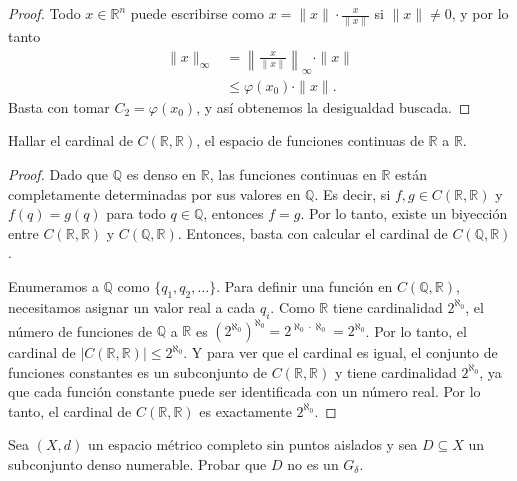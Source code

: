 \begin{proof}
    Todo $x \in \mathbb{R}^n$ puede escribirse como $x = \| x \| \cdot \frac{x}{\| x \|}$ si $\| x \| \neq 0$, y por lo tanto
    \begin{align*}
        \| x \|_{\infty} &= \left\| \frac{x}{\| x \|} \right\|_{\infty} \cdot \| x \| \\
        &\leq \varphi(x_0) \cdot \| x \|.
    \end{align*}
    Basta con tomar $C_2 = \varphi(x_0)$, y así obtenemos la desigualdad buscada.
\end{proof}

\begin{exercise}
    Hallar el cardinal de $C(\mathbb{R}, \mathbb{R})$, el espacio de funciones continuas de $\mathbb{R}$ a $\mathbb{R}$.
\end{exercise}

\begin{proof}
    Dado que $\mathbb{Q}$ es denso en $\mathbb{R}$, las funciones continuas en $\mathbb{R}$ están completamente determinadas por sus valores en $\mathbb{Q}$. Es decir, si $f, g \in C(\mathbb{R}, \mathbb{R})$ y $f(q) = g(q)$ para todo $q \in \mathbb{Q}$, entonces $f = g$. Por lo tanto, existe un biyección entre $C(\mathbb{R}, \mathbb{R})$ y $C(\mathbb{Q}, \mathbb{R})$. Entonces, basta con calcular el cardinal de $C(\mathbb{Q}, \mathbb{R})$.

    Enumeramos a $\mathbb{Q}$ como $\{ q_1, q_2, \ldots \}$. Para definir una función en $C(\mathbb{Q}, \mathbb{R})$, necesitamos asignar un valor real a cada $q_i$. Como $\mathbb{R}$ tiene cardinalidad $2^{\aleph_0}$, el número de funciones de $\mathbb{Q}$ a $\mathbb{R}$ es $(2^{\aleph_0})^{\aleph_0} = 2^{\aleph_0 \cdot \aleph_0} = 2^{\aleph_0}$. Por lo tanto, el cardinal de $|C(\mathbb{R}, \mathbb{R})| \leq 2^{\aleph_0}$. Y para ver que el cardinal es igual, el conjunto de funciones constantes es un subconjunto de $C(\mathbb{R}, \mathbb{R})$ y tiene cardinalidad $2^{\aleph_0}$, ya que cada función constante puede ser identificada con un número real. Por lo tanto, el cardinal de $C(\mathbb{R}, \mathbb{R})$ es exactamente $2^{\aleph_0}$.
\end{proof}

\begin{exercise}
    Sea $(X, d)$ un espacio métrico completo sin puntos aislados y sea $D \subseteq X$ un subconjunto denso numerable. Probar que $D$ no es un $G_\delta$.
\end{exercise}

